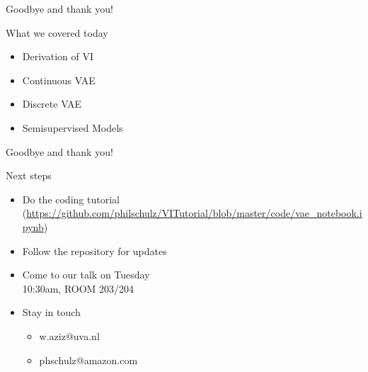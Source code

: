 \documentclass[14pt]{beamer}
\begin{document}
\begin{frame}{Goodbye and thank you!}
\begin{block}{What we covered today}
\begin{itemize}
\item Derivation of VI
\item Continuous VAE
\item Discrete VAE
\item Semisupervised Models
\end{itemize}
\end{block}
\end{frame}

\begin{frame}{Goodbye and thank you!}
\begin{block}{Next steps}
\begin{itemize}
\item Do the coding tutorial (\href{https://github.com/philschulz/VITutorial/blob/master/code/vae_notebook.ipynb}{\url{https://github.com/philschulz/VITutorial/blob/master/code/vae_notebook.ipynb}}) \pause
\item Follow the repository for updates \pause
\item Come to our talk on Tuesday \\
10:30am, ROOM 203/204 \pause
\item Stay in touch
\begin{itemize}
\item w.aziz@uva.nl
\item phschulz@amazon.com
\end{itemize}
\end{itemize}
\end{block}
\end{frame}
\end{document}

